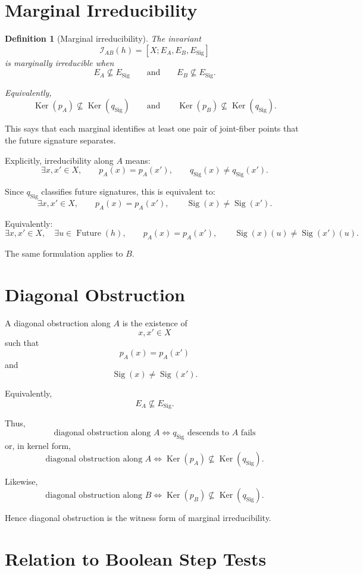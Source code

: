\documentclass[11pt]{article}
\newcommand{\Future}{\operatorname{Future}}
\newcommand{\Sig}{\operatorname{Sig}}
\newcommand{\Ker}{\operatorname{Ker}}
\newtheorem{definition}{Definition}
\begin{document}
\section{Marginal Irreducibility}

\begin{definition}[Marginal irreducibility]
The invariant
\[
\mathcal I_{AB}(h)=[X;E_A,E_B,E_\Sig]
\]
is marginally irreducible when
\[
\boxed{
E_A\nsubseteq E_\Sig
\qquad
\text{and}
\qquad
E_B\nsubseteq E_\Sig.
}
\]

Equivalently,
\[
\boxed{
\Ker(p_A)\nsubseteq\Ker(q_\Sig)
\qquad
\text{and}
\qquad
\Ker(p_B)\nsubseteq\Ker(q_\Sig).
}
\]
\end{definition}

This says that each marginal identifies at least one pair of joint-fiber points that the future signature separates.

Explicitly, irreducibility along \(A\) means:
\[
\exists x,x'\in X,
\qquad
p_A(x)=p_A(x'),
\qquad
q_\Sig(x)\neq q_\Sig(x').
\]

Since \(q_\Sig\) classifies future signatures, this is equivalent to:
\[
\exists x,x'\in X,
\qquad
p_A(x)=p_A(x'),
\qquad
\Sig(x)\neq\Sig(x').
\]

Equivalently:
\[
\exists x,x'\in X,
\quad
\exists u\in\Future(h),
\qquad
p_A(x)=p_A(x'),
\qquad
\Sig(x)(u)\neq\Sig(x')(u).
\]

The same formulation applies to \(B\).

\section{Diagonal Obstruction}

A diagonal obstruction along \(A\) is the existence of
\[
x,x'\in X
\]
such that
\[
p_A(x)=p_A(x')
\]
and
\[
\Sig(x)\neq\Sig(x').
\]

Equivalently,
\[
E_A\nsubseteq E_\Sig.
\]

Thus,
\[
\boxed{
\text{diagonal obstruction along }A
\iff
q_\Sig \text{ descends to } A \text{ fails}
}
\]
or, in kernel form,
\[
\boxed{
\text{diagonal obstruction along }A
\iff
\Ker(p_A)\nsubseteq\Ker(q_\Sig).
}
\]

Likewise,
\[
\boxed{
\text{diagonal obstruction along }B
\iff
\Ker(p_B)\nsubseteq\Ker(q_\Sig).
}
\]

Hence diagonal obstruction is the witness form of marginal irreducibility.

\section{Relation to Boolean Step Tests}
\end{document}
